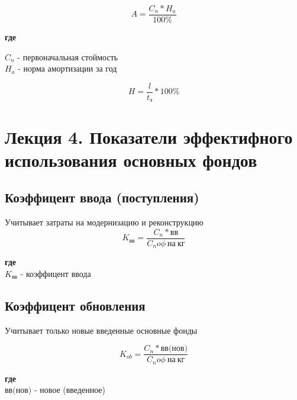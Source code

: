 \documentclass[11pt]{article}
\begin{document}
\begin{equation}  
A = \frac{C_{n}*H_{a}}{100\%}
\end{equation}

\textbf{где} \\[0pt]

\begin{flushleft}
$C_{n}$ - первоначальная стоймость \\
$H_{a}$ - норма амортизации за год \\
\end{flushleft}


\begin{equation}
H=\frac{l}{t_{\text{э}}}*100\%  
\end{equation}

\section{Лекция 4. Показатели эффектифного использования основных фондов}
\label{sec:org208cd8e}

\subsection{Коэффицент ввода (поступления)}
\label{sec:org351fd4a}

Учитывает затраты на модернизацию и реконструкцию \\[0pt]

\begin{equation}
  K_{\text{вв}} = \frac{C_{n}*\text{вв}}{C_{n}o\phi \  \text{на} \   \text{кг}}
\end{equation}

\textbf{где} \\[0pt]

\(K_\text{вв}\) - коэффицент ввода

\subsection{Коэффицент обновления}
\label{sec:orge70c05b}

Учитывает только новые введенные основные фонды

\begin{equation}
  K_{ob} = \frac{C_{n}*\text{вв(нов)}}{C_{n}o\phi \  \text{на} \  \text{кг}}
\end{equation}

\textbf{где} \\[0pt]

\(\text{вв(нов)}\) - новое (введенное)
\end{document}
